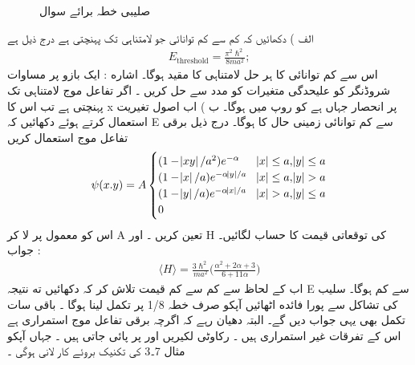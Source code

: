 \begin{figure} \centering
{} 
\caption{صلیبی خطہ برائے سوال } 
\label{شکل_تغیریت_صلیبی_خطہ} 
\end{figure} 
الف ) دکھائیں کہ کم سے کم توانائی جو لامتناہی تک پہنچتی ہے درج ذیل ہے
\begin{align}
E_{\text{threshold}}=\frac{\pi^{2}\hslash^{2}}{8ma^{2}};
\end{align}
 اس سے کم توانائی کا ہر حل لامتناہی کا مقید ہوگا۔
اشاره : ایک بازو پر  مساوات شروڈنگر کو علیحدگی متغیرات کو مدد سے حل کریں ۔ اگر تفاعل موج لامتناہی تک پہنچتی ہے تب اس کا x پر انحصار  جہاں  ہے کو روپ میں ہوگا۔
ب ) اب اصول تغیریت استعمال کرتے ہوئے دکھائیں کہ  E سے کم توانائی زمینی حال کا ہوگا۔ درج ذیل برقی تفاعل موج استعمال کریں 
\begin{align}
\psi(x.y)=A\begin{cases} (1-\abs{xy}/a^{2})e^{-\alpha} & \abs{x}\leq a,\abs{y}\leq a\\
(1-\abs{x}/a)e^{-\alpha\abs{y}/a} & \abs{x}\leq a ,\abs{y}> a\\
(1-\abs{y}/a)e^{-\alpha\abs{x}/a} & \abs{x}> a,\abs{y}\leq a\\
0\\
\end{cases} 
\end{align}
 اس کو معمول پر لا کر A تعین کریں ۔ اور H کی توقعاتی قیمت کا حساب لگائیں۔
جواب :
\begin{align}
\langle H \rangle=\frac{3\hslash^{2}}{ma^{2}}\big (\frac{\alpha^{2}+2\alpha+3}{6+11\alpha}\big )
\end{align}
 اب  کے لحاظ سے کم سے کم قیمت تلاش کر کہ دکھائیں  ته نتیجہ  E سے کم ہوگا۔ سلیب کی تشاکل سے پورا  فائده   اٹھائیں آپکو صرف خطہ
1/8
پر تکمل لینا ہوگا ۔ باقی سات تکمل بھی یہی جواب دیں گے۔ البتہ  دھیان رہے کہ اگرچہ  برقی  تفاعل  موج استمراری ہے اس کے  تفرقات  غیر استمراری ہیں ۔ رکاوٹی لکیریں  اور  پر پائی  جاتی ہیں ۔ جہاں آپکو مثال 7۔3 کی تکنیک بروئے کار  لانی  ہوگی ۔

